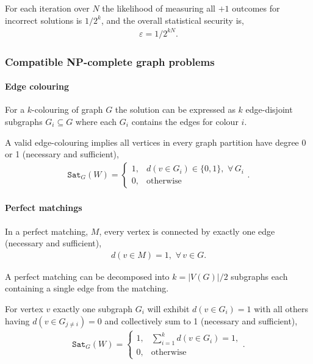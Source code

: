 \documentclass[twocolumn, aps, amsmath, amssymb, nofootinbib, superscriptaddress, longbibliography, doublefloatfix, table-of-contents, eqsecnum, rmp]{revtex4-2}
\begin{document}
For each iteration over $N$ the likelihood of measuring all $+1$ outcomes for incorrect solutions is $1/2^k$, and the overall statistical security is,
\begin{align}
	\varepsilon = 1/2^{kN}.	
\end{align}

\subsubsection{Compatible NP-complete graph problems}

\paragraph{Edge colouring}

For a $k$-colouring of graph $G$ the solution can be expressed as $k$ edge-disjoint subgraphs $G_i\subseteq G$ where each $G_i$ contains the edges for colour $i$.

A valid edge-colouring implies all vertices in every graph partition have degree 0 or 1 (necessary and sufficient),
\begin{align}
	\texttt{Sat}_G(W) = \begin{cases}
		1, &d(v\in G_i)\in \{0,1\},\,\,\forall\,G_i \\
		0, &\mathrm{otherwise}
 	\end{cases}.
\end{align}

\paragraph{Perfect matchings}

In a perfect matching, $M$, every vertex is connected by exactly one edge (necessary and sufficient),
\begin{align}
	d(v\in M) = 1,\,\,\forall\,v\in G.
\end{align}

A perfect matching can be decomposed into \mbox{$k=|V(G)|/2$} subgraphs each containing a single edge from the matching.

For vertex $v$ exactly one subgraph $G_i$ will exhibit \mbox{$d(v\in G_i)=1$} with all others having \mbox{$d(v\in G_{j\neq i})=0$} and collectively sum to 1 (necessary and sufficient),
\begin{align}
	\texttt{Sat}_G(W) = \begin{cases}
		1, &\sum_{i=1}^k d(v\in G_i)=1,\\
		0, &\mathrm{otherwise}
 	\end{cases}.
\end{align}


\end{document}
